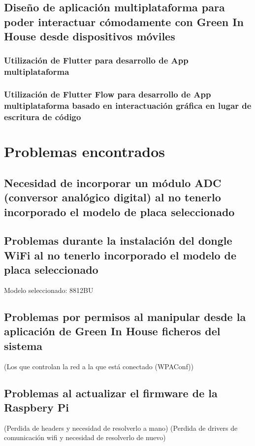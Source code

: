     \subsection{Diseño de aplicación multiplataforma para poder interactuar cómodamente con Green In House desde dispositivos móviles}

        \subsubsection{Utilización de Flutter para desarrollo de App multiplataforma}
        

        \subsubsection{Utilización de Flutter Flow para desarrollo de App multiplataforma basado en interactuación gráfica en lugar de escritura de código}


\section{Problemas encontrados}

    
    \subsection{Necesidad de incorporar un módulo ADC (conversor analógico digital) al no tenerlo incorporado el modelo de placa seleccionado}
    
    
    
    \subsection{Problemas durante la instalación del dongle WiFi al no tenerlo incorporado el modelo de placa seleccionado}
    Modelo seleccionado: 8812BU
    
    
    \subsection{Problemas por permisos al manipular desde la aplicación de Green In House ficheros del sistema}
    (Los que controlan la red a la que está conectado (WPAConf))
    
    
    
    \subsection{Problemas al actualizar el firmware de la Raspbery Pi}
    (Perdida de headers y necesidad de resolverlo a mano)
    (Perdida de drivers de comunicación wifi y necesidad de resolverlo de nuevo)
    
